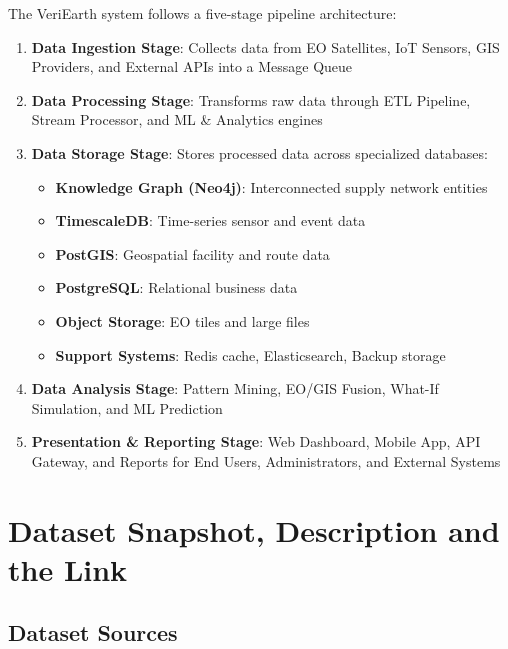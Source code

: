 \documentclass[11pt,a4paper]{article}
\begin{document}
The VeriEarth system follows a five-stage pipeline architecture:

\begin{enumerate}
    \item \textbf{Data Ingestion Stage}: Collects data from EO Satellites, IoT Sensors, GIS Providers, and External APIs into a Message Queue
    \item \textbf{Data Processing Stage}: Transforms raw data through ETL Pipeline, Stream Processor, and ML \& Analytics engines
    \item \textbf{Data Storage Stage}: Stores processed data across specialized databases:
    \begin{itemize}
        \item \textbf{Knowledge Graph (Neo4j)}: Interconnected supply network entities
        \item \textbf{TimescaleDB}: Time-series sensor and event data
        \item \textbf{PostGIS}: Geospatial facility and route data
        \item \textbf{PostgreSQL}: Relational business data
        \item \textbf{Object Storage}: EO tiles and large files
        \item \textbf{Support Systems}: Redis cache, Elasticsearch, Backup storage
    \end{itemize}
    \item \textbf{Data Analysis Stage}: Pattern Mining, EO/GIS Fusion, What-If Simulation, and ML Prediction
    \item \textbf{Presentation \& Reporting Stage}: Web Dashboard, Mobile App, API Gateway, and Reports for End Users, Administrators, and External Systems
\end{enumerate}

\section{Dataset Snapshot, Description and the Link}

\subsection{Dataset Sources}
\end{document}
